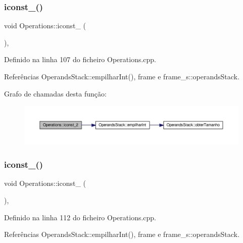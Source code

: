 \subsubsection{\texorpdfstring{iconst\+\_()}{iconst\_2()}}
{\footnotesize\ttfamily void Operations\+::iconst\+\_ (\begin{DoxyParamCaption}{ }\end{DoxyParamCaption})\hspace{0.3cm}{\ttfamily [static]}, {\ttfamily [private]}}



Definido na linha 107 do ficheiro Operations.\+cpp.



Referências Operands\+Stack\+::empilhar\+Int(), frame e frame\+\_\+s\+::operands\+Stack.

Grafo de chamadas desta função\+:
\nopagebreak
\begin{figure}[H]
\begin{center}
\leavevmode
\includegraphics[width=350pt]{classOperations_af1a4f99f0d99da0a7db7fc926932a3c8_cgraph}
\end{center}
\end{figure}
\mbox{\label{classOperations_ab8466864c000152e75172b623704f610}} 
\subsubsection{\texorpdfstring{iconst\+\_()}{iconst\_3()}}
{\footnotesize\ttfamily void Operations\+::iconst\+\_ (\begin{DoxyParamCaption}{ }\end{DoxyParamCaption})\hspace{0.3cm}{\ttfamily [static]}, {\ttfamily [private]}}



Definido na linha 112 do ficheiro Operations.\+cpp.



Referências Operands\+Stack\+::empilhar\+Int(), frame e frame\+\_\+s\+::operands\+Stack.

